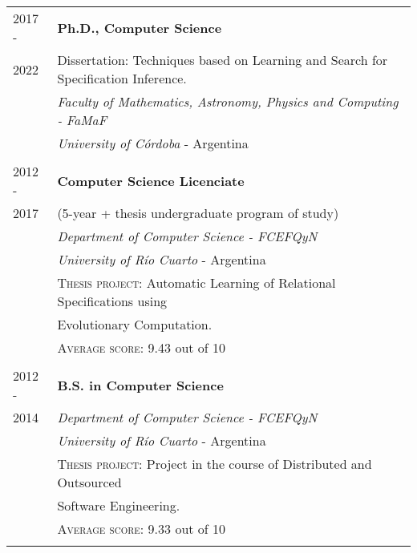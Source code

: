 \documentclass[a4paper,10pt]{article} %
\begin{document}
\begin{tabular}{ll}
\\
2017 - & \textbf{Ph.D., Computer Science} \\
2022 & Dissertation: Techniques based on Learning and Search for Specification Inference. \\
& \textit{Faculty of Mathematics, Astronomy, Physics and Computing - FaMaF} \\ & \textit{University of Córdoba} - Argentina \\ & \\

2012 - & \textbf{Computer Science Licenciate} \\
2017 & (5-year + thesis undergraduate program of study) \\
& \textit{Department of Computer Science - FCEFQyN} \\ & \textit{University of Río Cuarto} - Argentina \\ 
& \textsc{Thesis project:} Automatic Learning of Relational Specifications using \\ 
& Evolutionary Computation. \\ 
& \textsc{Average score:} 9.43 out of 10 \\ & \\

2012 -	& \textbf{B.S. in Computer Science} \\
2014 & \textit{Department of Computer Science - FCEFQyN} \\ 
& \textit{University of Río Cuarto} - Argentina \\
& \textsc{Thesis project:} Project in the course of Distributed and Outsourced \\ 
& Software Engineering. \\ 
& \textsc{Average score:} 9.33 out of 10 \\ \\ 

\end{tabular}
\end{document}
